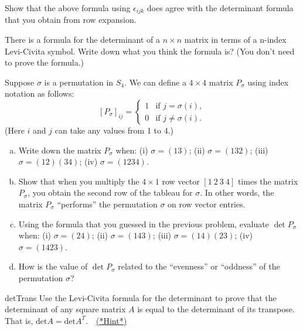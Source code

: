\begin{exercise}{}
Show that the above formula using $\epsilon_{ijk}$ does agree with the determinant formula that you obtain from row expansion.
\end{exercise}

\begin{exercise}{}
There is a formula for the determinant of a $n \times n$  matrix in terms of a n-index Levi-Civita symbol. Write down what you think the formula is? (You don't need to prove the formula.)
\end{exercise}

\begin{exercise}{}
Suppose $\sigma$ is a permutation in $S_4$. We can define a $4 \times 4$ matrix $P_{\sigma}$ using index notation as follows:  
\[ [P_{\sigma}]_{ij} = \begin{cases} 1 &\mbox{if } j = \sigma(i), \\ 
 0 &\mbox{if } j \neq  \sigma(i).  \end{cases} \]
(Here $i$ and $j$ can take any values from 1 to 4.)  
\begin{enumerate}[(a)]
\item
Write down the matrix $P_{\sigma}$ when: (i) $\sigma = (13)$; (ii) $\sigma = (132)$; (iii) $\sigma = (12)(34)$; (iv)  $\sigma = (1234)$.
\item
Show that when you multiply the $4 \times 1$ row vector $[1~2~3~4]$ times the matrix $P_{\sigma}$, you obtain the second row of the tableau for $\sigma$.  In other words, the matrix $P_{\sigma}$ ``performs'' the permutation $\sigma$ on row vector entries.
\item
Using the formula that you guessed in the previous problem, evaluate $\det P_{\sigma}$ when: (i) $\sigma = (24)$; (ii) $\sigma = (143)$; (iii) $\sigma = (14)(23)$; (iv)  $\sigma = (1423)$.
\item
How is the value of $\det P_{\sigma}$  related to the ``evenness'' or ``oddness'' of the permutation $\sigma$?
\end{enumerate}
\end{exercise}

\begin{exercise}{detTrans}
Use the Levi-Civita formula for the determinant to prove that the determinant of any square matrix $A$ is equal to the determinant of its transpose.  That is, $\text{det} A = \text{det}A^{T}$.~~\hyperref[sec:sigma:hints]{(*Hint*)} 
\end{exercise}

